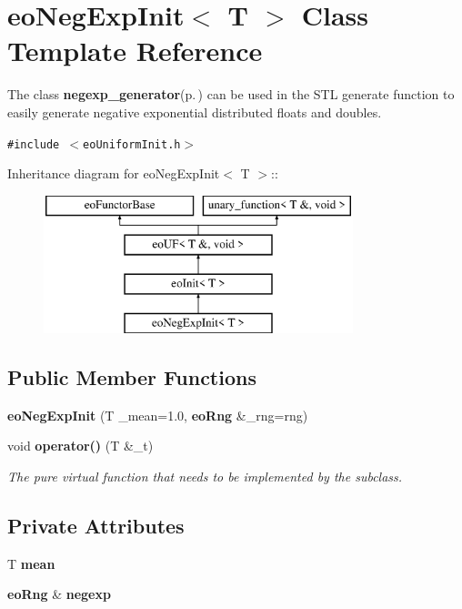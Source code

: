 \section{eo\-Neg\-Exp\-Init$<$ T $>$ Class Template Reference}
\label{classeo_neg_exp_init}
The class {\bf negexp\_\-generator}{\rm (p.\,\pageref{classnegexp__generator})} can be used in the STL generate function to easily generate negative exponential distributed floats and doubles.  


{\tt \#include $<$eo\-Uniform\-Init.h$>$}

Inheritance diagram for eo\-Neg\-Exp\-Init$<$ T $>$::\begin{figure}[H]
\begin{center}
\leavevmode
\includegraphics[height=4cm]{classeo_neg_exp_init}
\end{center}
\end{figure}
\subsection*{Public Member Functions}
\begin{CompactItemize}
\item 
{\bf eo\-Neg\-Exp\-Init} (T \_\-mean=1.0, {\bf eo\-Rng} \&\_\-rng=rng)\label{classeo_neg_exp_init_a0}

\item 
void {\bf operator()} (T \&\_\-t)\label{classeo_neg_exp_init_a1}

\begin{CompactList}\small\item\em The pure virtual function that needs to be implemented by the subclass. \item\end{CompactList}\end{CompactItemize}
\subsection*{Private Attributes}
\begin{CompactItemize}
\item 
T {\bf mean}\label{classeo_neg_exp_init_r0}

\item 
{\bf eo\-Rng} \& {\bf negexp}\label{classeo_neg_exp_init_r1}

\end{CompactItemize}


